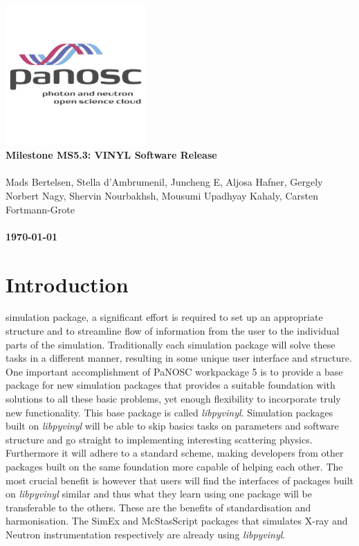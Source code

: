 \documentclass[10pt]{scrartcl}
\begin{document}
\makeatletter
\begin{titlepage}
\thispagestyle{scrheadings}
\ohead{}
\ihead{}
\chead{}
\ifoot{}
\ofoot{}
\noindent%
\includegraphics[width=0.4\textwidth]{figures/PaNOSClogo_web_RGB_512x512.jpg}\\
\Huge{%
\renewcommand{\baselinestretch}{2.0}%
  \textbf{%
    Milestone MS5.3: VINYL Software Release\\
  }%
}%
\\
{%
\Large{%
  Mads Bertelsen,
  Stella d'Ambrumenil,
  Juncheng E,
  Aljosa Hafner,
  Gergely Norbert Nagy,
  Shervin Nourbakhsh,
  Mousumi Upadhyay Kahaly,
  Carsten Fortmann-Grote
  \bigskip\\
  \bigskip\\
  \textbf{\today}%
}}%
\end{titlepage}
\makeatother

\section{Introduction}
simulation package, a significant effort is required to set up an appropriate
structure and to streamline flow of information from the user to the individual
parts of the simulation. Traditionally each simulation package will solve these
tasks in a different manner, resulting in some unique user interface and
structure. One important accomplishment of PaNOSC workpackage 5 is to provide a
base package for new simulation packages that provides a suitable foundation
with solutions to all these basic problems, yet enough flexibility to
incorporate truly new functionality. This base package is called
\textit{libpyvinyl}. Simulation packages built on \textit{libpyvinyl} will be
able to skip basics tasks on parameters and software structure and go straight
to implementing interesting scattering physics. Furthermore it will adhere to a
standard scheme, making developers from other packages built on the same
foundation more capable of helping each other. The most crucial benefit is
however that users will find the interfaces of packages built on
\textit{libpyvinyl} similar and thus what they learn using one package will be
transferable to the others. These are the benefits of standardisation and
harmonisation. The SimEx and McStasScript packages that simulates X-ray and
Neutron instrumentation respectively are already using \textit{libpyvinyl}.
\end{document}

